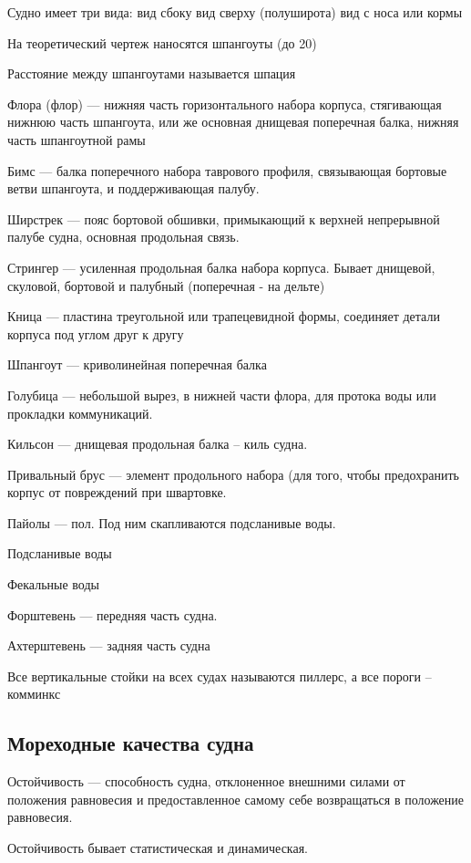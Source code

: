 \documentclass{article}        %
\begin{document}
Судно имеет три вида:
вид сбоку
вид сверху (полуширота)
вид с носа или кормы

На теоретический чертеж наносятся шпангоуты
(до 20)

Расстояние между шпангоутами называется шпация


Флора (флор) --- нижняя часть горизонтального набора корпуса, 
	стягивающая нижнюю часть шпангоута, или же основная
	днищевая поперечная балка, нижняя часть шпангоутной рамы

Бимс --- балка поперечного набора таврового профиля, связывающая 
	бортовые ветви шпангоута, и поддерживающая палубу.


Ширстрек --- пояс бортовой обшивки, примыкающий к верхней непрерывной 
	палубе судна, основная продольная связь.

Стрингер --- усиленная продольная балка набора корпуса. Бывает
	днищевой, скуловой, бортовой и палубный (поперечная - на дельте)

Кница --- пластина треугольной или трапецевидной формы, соединяет детали корпуса под углом друг к другу

Шпангоут --- криволинейная поперечная балка

Голубица --- небольшой вырез, в нижней части флора, для протока воды или прокладки коммуникаций.

Кильсон --- днищевая продольная балка -- киль судна.

Привальный брус --- элемент продольного набора (для того, чтобы предохранить корпус от повреждений
	при швартовке. 

Пайолы --- пол. Под ним скапливаются подсланивые воды.

Подсланивые воды

Фекальные воды

Форштевень --- передняя часть судна.

Ахтерштевень --- задняя часть судна

Все вертикальные стойки на всех судах называются пиллерс, а все пороги -- комминкс




\subsection{Мореходные качества судна}
Остойчивость --- способность судна, отклоненное внешними силами от положения равновесия
	и предоставленное самому себе возвращаться в положение равновесия.

Остойчивость бывает статистическая и динамическая.
\end{document}

